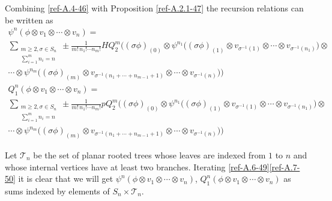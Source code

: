 \documentclass{amsart}
\numberwithin{equation}{section}
\let\cal\mathcal
\theoremstyle{definition}
\theoremstyle{remark}
\begin{document}
Combining \eqref{ref-A.4-46} with Proposition \ref{ref-A.2.1-47}
the recursion relations can be written as
\begin{multline}
\label{ref-A.6-49}
\psi^n(\phi\otimes v_1\otimes \cdots\otimes v_n)=\\
\sum_{\begin{smallmatrix}m\ge 2,\sigma\in S_n\\ \sum_{i=1}^m n_i=n\end{smallmatrix}}\pm
\frac{1}{m!\,n_1!\cdots n_m!} HQ^m_2((\sigma\phi)_{(0)}\otimes \psi^{n_1}\bigl((\sigma\phi)_{(1)}\otimes
  v_{\sigma^{-1}(1)}\otimes\cdots \otimes
  v_{\sigma^{-1}(n_1)}\bigr)\otimes\\\cdots \otimes
  \psi^{n_m}\bigl((\sigma\phi)_{(m)}\otimes
  v_{\sigma^{-1}(n_1+\cdots+n_{m-1}+1)}\otimes\cdots \otimes
  v_{\sigma^{-1}(n)}\bigr))
\end{multline}
\begin{multline}
\label{ref-A.7-50}
Q_1^n(\phi\otimes v_1\otimes \cdots\otimes v_n)=\\
\sum_{\begin{smallmatrix}m\ge 2,\sigma\in S_n\\ \sum_{i=1}^m n_i=n\end{smallmatrix}}\pm
\frac{1}{m!\,n_1!\cdots n_m!} pQ^m_2((\sigma\phi)_{(0)}\otimes \psi^{n_1}\bigl((\sigma\phi)_{(1)}\otimes
  v_{\sigma^{-1}(1)}\otimes\cdots \otimes
  v_{\sigma^{-1}(n_1)}\bigr)\otimes\\\cdots \otimes
  \psi^{n_m}\bigl((\sigma\phi)_{(m)}\otimes
  v_{\sigma^{-1}(n_1+\cdots+n_{m-1}+1)}\otimes\cdots \otimes
  v_{\sigma^{-1}(n)}\bigr))
\end{multline}

Let ${{\cal T}}_n$ be the set
of planar rooted trees whose leaves are indexed from $1$ to $n$ and whose
internal vertices have at least two branches. 
Iterating \eqref{ref-A.6-49}\eqref{ref-A.7-50} it is clear that we will get
$\psi^n(\phi\otimes v_1\otimes\cdots\otimes v_n)$, $Q_1^n(\phi\otimes v_1\otimes\cdots\otimes v_n)$ as sums indexed by
elements of $S_n\times {{\cal T}}_n$. 
\end{document}
